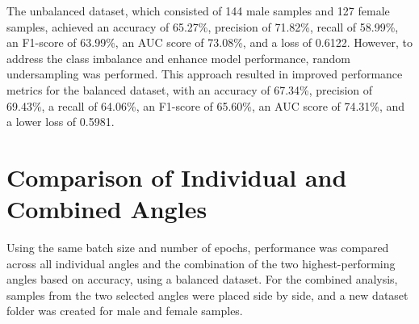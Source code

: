 \begin{table}[H]
	\centering
	\caption{Performance Metrics for Unbalanced vs. Balanced Datasets (Batch Size: 16, Epochs: 20)}
	\label{tab:unbalanced-balanced}
\end{table}

	The unbalanced dataset, which consisted of 144 male samples and 127 female samples, achieved an accuracy of 65.27\%, precision of 71.82\%, recall of 58.99\%, an F1-score of 63.99\%, an AUC score of 73.08\%, and a loss of 0.6122. However, to address the class imbalance and enhance model performance, random undersampling was performed. This approach resulted in improved performance metrics for the balanced dataset, with an accuracy of 67.34\%, precision of 69.43\%, a recall of 64.06\%, an F1-score of 65.60\%, an AUC score of 74.31\%, and a lower loss of 0.5981.
	
\section{Comparison of Individual and Combined Angles}
Using the same batch size and number of epochs, performance was compared across all individual angles and the combination of the two highest-performing angles based on accuracy, using a balanced dataset. For the combined analysis, samples from the two selected angles were placed side by side, and a new dataset folder was created for male and female samples. 

